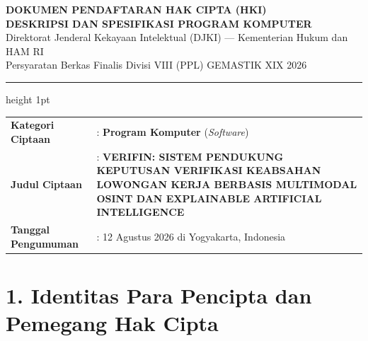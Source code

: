\documentclass[11pt,a4paper]{article}
\begin{document}
\begin{center}
    {\fontsize{14}{16}\selectfont\textbf{DOKUMEN PENDAFTARAN HAK CIPTA (HKI)}}\\[3pt]
    {\fontsize{12}{14}\selectfont\textbf{DESKRIPSI DAN SPESIFIKASI PROGRAM KOMPUTER}}\\[2pt]
    {\fontsize{10}{12}\selectfont Direktorat Jenderal Kekayaan Intelektual (DJKI) --- Kementerian Hukum dan HAM RI}\\[1pt]
    {\fontsize{9}{11}\selectfont Persyaratan Berkas Finalis Divisi VIII (PPL) GEMASTIK XIX 2026}
\end{center}

\vspace{0.5em}
\hrule height 1pt
\vspace{1em}

\begin{tabularx}{\textwidth}{@{}p{3.8cm}X@{}}
\textbf{Kategori Ciptaan} & : \textbf{Program Komputer} (\textit{Software}) \\
\textbf{Judul Ciptaan}    & : \textbf{VERIFIN: SISTEM PENDUKUNG KEPUTUSAN VERIFIKASI KEABSAHAN LOWONGAN KERJA BERBASIS MULTIMODAL OSINT DAN EXPLAINABLE ARTIFICIAL INTELLIGENCE} \\
\textbf{Tanggal Pengumuman} & : 12 Agustus 2026 di Yogyakarta, Indonesia \\
\end{tabularx}

\vspace{1em}

\section*{1. Identitas Para Pencipta dan Pemegang Hak Cipta}
\end{document}
